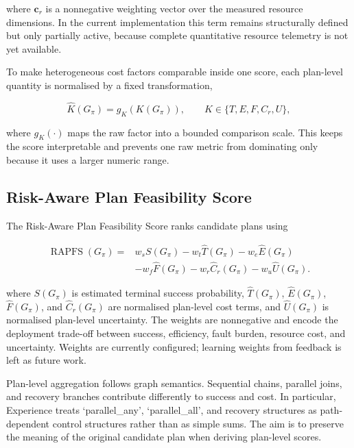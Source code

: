 \documentclass[letterpaper, 10pt, conference]{ieeeconf}
\begin{document}
where $\mathbf{c}_r$ is a nonnegative weighting vector over the measured resource dimensions. In the current implementation this term remains structurally defined but only partially active, because complete quantitative resource telemetry is not yet available.

To make heterogeneous cost factors comparable inside one score, each plan-level quantity is normalised by a fixed transformation,

\begin{equation}
\hat{K}(G_{\pi})=g_K\left(K(G_{\pi})\right),
\qquad
K\in\{T,E,F,C_r,U\},
\end{equation}

where $g_K(\cdot)$ maps the raw factor into a bounded comparison scale. This keeps the score interpretable and prevents one raw metric from dominating only because it uses a larger numeric range.

\subsection{Risk-Aware Plan Feasibility Score}

The Risk-Aware Plan Feasibility Score ranks candidate plans using


\begin{equation}
\begin{aligned}
\operatorname{RAPFS}(G_{\pi}) ={}& w_s S(G_{\pi}) - w_t \hat{T}(G_{\pi}) - w_e \hat{E}(G_{\pi}) \\
& - w_f \hat{F}(G_{\pi}) - w_r \hat{C}_r(G_{\pi}) - w_u \hat{U}(G_{\pi}).
\end{aligned}
\end{equation}

where $S(G_{\pi})$ is estimated terminal success probability, $\hat{T}(G_{\pi})$, $\hat{E}(G_{\pi})$, $\hat{F}(G_{\pi})$, and $\hat{C}_r(G_{\pi})$ are normalised plan-level cost terms, and $\hat{U}(G_{\pi})$ is normalised plan-level uncertainty. The weights are nonnegative and encode the deployment trade-off between success, efficiency, fault burden, resource cost, and uncertainty. Weights are currently configured; learning weights from feedback is left as future work.

Plan-level aggregation follows graph semantics. Sequential chains, parallel joins, and recovery branches contribute differently to success and cost. In particular, Experience treats `parallel\_any', `parallel\_all', and recovery structures as path-dependent control structures rather than as simple sums. The aim is to preserve the meaning of the original candidate plan when deriving plan-level scores.
\end{document}
